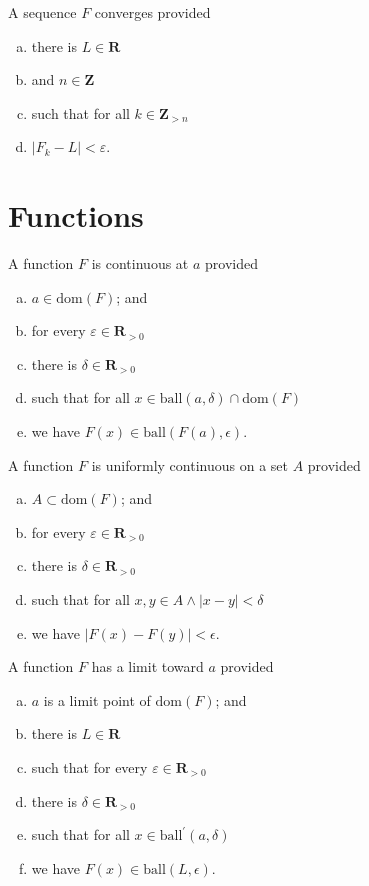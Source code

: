 \documentclass[letterpaper,landscape,9pt,fleqn]{extarticle}
\newcommand{\dom}{\mathrm{dom}}
\newcommand{\reals}{\mathbf{R}}
\newcommand{\ball}{\mathrm{ball}}
\newcommand{\integers}{\mathbf{Z}}
\newenvironment{alphalist}{
  \begin{enumerate}[(a)]
    \addtolength{\itemsep}{-1.0\itemsep}}
  {\end{enumerate}}
\begin{document}
\begin{multicols*}{3}
\begin{description}[\itemsep=0em]
\item[Converges] A sequence $F$ converges provided
\begin{alphalist}
    \item there is $L \in \reals$
    \item and $n \in \integers$
    \item such that for all $k \in \integers_{>n}$
    \item $|F_k - L | < \varepsilon$.
\end{alphalist}
\end{description}

\section*{Functions}   
\begin{description}[\itemsep=0em]
    \item[Continuous] A function $F$ is continuous at $a$ provided
    \begin{alphalist}
        \item $a \in \dom(F)$; and
        \item for every $\varepsilon \in \reals_{>0}$
        \item there is $\delta \in \reals_{>0}$
        \item such that for all $x \in \ball(a,\delta) \cap \dom(F)$
        \item we have $F(x) \in \ball(F(a), \epsilon)$.
    \end{alphalist}

    \item[Uniformly continuous]  A function $F$ is uniformly continuous on a set $A$ provided 
       \begin{alphalist}
          \item $A \subset \dom(F)$; and
          \item for every $\varepsilon \in \reals_{>0}$
          \item there is $\delta \in \reals_{>0}$
          \item such that for all $x,y  \in A \land |x-y| < \delta$
          \item we have $|F(x) - F(y)| < \epsilon$.
       \end{alphalist} 
    \item[Limit]  A function $F$ has a limit toward $a$ provided
       \begin{alphalist}
          \item $a$ is a limit point of $\dom(F)$; and
          \item there is $L \in \reals$
          \item such that for every $\varepsilon \in \reals_{>0}$
          \item there is $\delta \in \reals_{>0}$
          \item such that for all $x \in \ball^\prime(a,\delta)$
          \item we have $F(x) \in \ball(L, \epsilon)$.
       \end{alphalist} 


\end{description}
\end{multicols*}
\end{document}
